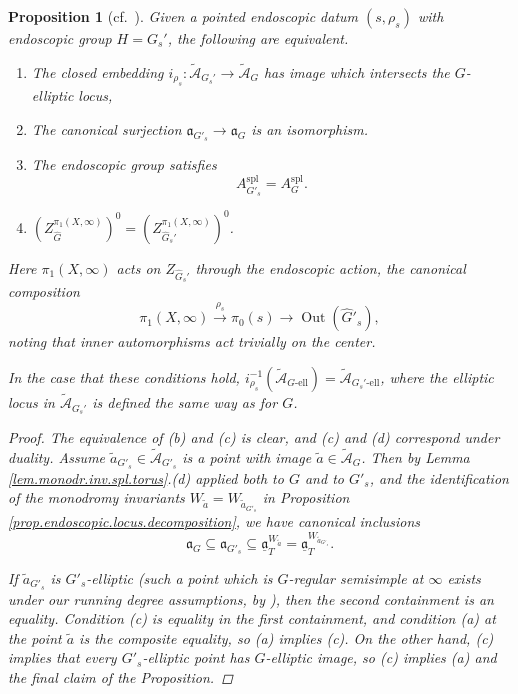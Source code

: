 \documentclass[openany]{amsbook}
\newtheorem{proposition}[theorem]{Proposition}
\theoremstyle{definition}
\theoremstyle{remark}
\numberwithin{equation}{section}
\newcommand{\cA}{\mathcal{A}}
\newcommand{\ul}[1]{\underline{#1}}
\renewcommand{\-}{\operatorname{-}}
\newcommand{\Out}{\operatorname{Out}}
\renewcommand{\a}{\mathfrak{a}}
\newcommand{\wtilde}[1]{\widetilde{#1}}
\newcommand{\el}{\text{-ell}}
\newcommand{\ctA}{\widetilde{\cA}}
\newcommand{\spl}{\mathrm{spl}}
\newcommand{\ga}{\ul{\a}}
\begin{document}
\begin{proposition}[{{cf.\ \cite[10.6.6, 10.6.10]{CLII}}}]\label{prop.ell.end.data}
    Given a pointed endoscopic datum $(s, \rho_{s})$ with endoscopic group $H = G_s'$, the following are equivalent.
    \begin{enumerate}[label=(\alph*)]
        \item The closed embedding $i_{\rho_s} : \ctA_{G_s'} \to \ctA_G$ has image which intersects the $G$-elliptic locus,
        \item The canonical surjection $\a_{G'_s} \to \a_G$ is an isomorphism.
        \item The endoscopic group satisfies 
        $$
            A_{G'_s}^\spl = A_{G}^\spl.
        $$
        \item $(Z_{\widehat{G}}^{\pi_1(X, \infty)})^0 = (Z_{\widehat{G}_s'}^{\pi_1(X, \infty)})^0$.
    \end{enumerate}
    Here $\pi_1(X, \infty)$ acts on $Z_{\widehat{G}_s'}$ through the endoscopic action, the canonical composition
    $$
        \pi_1(X, \infty) \xrightarrow{\rho_s} \pi_0(s) \to \Out(\widehat{G}'_s),
    $$
    noting that inner automorphisms act trivially on the center.
    
    In the case that these conditions hold, $i_{\rho_s}^{-1}(\ctA_{G\el}) = \ctA_{G_s'\el}$, where the elliptic locus in $\ctA_{G_s'}$ is defined the same way as for $G$. 
    
    \begin{proof}
        The equivalence of (b) and (c) is clear, and (c) and (d) correspond under duality. Assume $\wtilde{a}_{G'_s} \in \ctA_{G'_s}$ is a point with image $\wtilde{a} \in \ctA_G$. Then by Lemma \ref{lem.monodr.inv.spl.torus}.(d) applied both to $G$ and to $G'_s$, and the identification of the monodromy invariants $W_{\wtilde{a}} = W_{\wtilde{a}_{G'_s}}$ in Proposition \ref{prop.endoscopic.locus.decomposition}, we have canonical inclusions
        $$
            \a_G \subseteq \a_{G'_s} \subseteq \ga_T^{W_{\wtilde{a}}} =\ga_T^{W_{\wtilde{a}_{G'_s}}}.
        $$

        If $\wtilde{a}_{G'_s}$ is $G'_s$-elliptic (such a point which is $G$-regular semisimple at $\infty$ exists under our running degree assumptions, by \cite[4.7.1, 4.7.2, 4.7.5]{ngofl}), then the second containment is an equality. Condition (c) is equality in the first containment, and condition (a) at the point $\wtilde{a}$ is the composite equality, so (a) implies (c). On the other hand, (c) implies that \emph{every} $G'_s$-elliptic point has $G$-elliptic image, so (c) implies (a) and the final claim of the Proposition.
    \end{proof}
\end{proposition}
\end{document}
